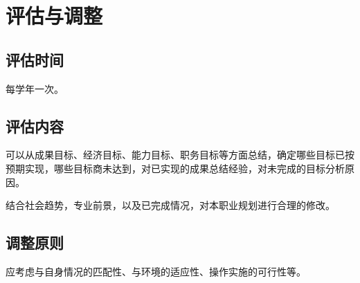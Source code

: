 \documentclass{article}
\begin{document}
\section{评估与调整}
\subsection{评估时间}
每学年一次。\par
\subsection{评估内容}
可以从成果目标、经济目标、能力目标、职务目标等方面总结，确定哪些目标已按预期实现，哪些目标商未达到，对已实现的成果总结经验，对未完成的目标分析原因。\par
结合社会趋势，专业前景，以及已完成情况，对本职业规划进行合理的修改。\par
\subsection{调整原则}
应考虑与自身情况的匹配性、与环境的适应性、操作实施的可行性等。\par
\end{document}
